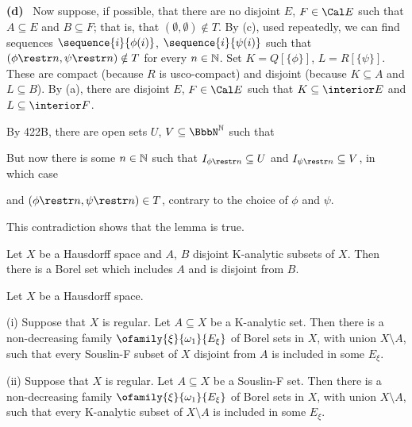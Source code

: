 {\medskip

{\bf (d)} \Quer\ Now suppose, if possible, that there are no disjoint
$E$, $F\in\Cal E$ such that $A\subseteq E$ and $B\subseteq F$;  that is,
that $(\emptyset,\emptyset)\notin T$.   By (c),
used repeatedly, we can find sequences
$\sequence{i}{\phi(i)}$, $\sequence{i}{\psi(i)}$ such that
$(\phi\restr n,\psi\restr n)\notin T$ for every $n\in\Bbb N$.   Set
$K=Q[\{\phi\}]$, $L=R[\{\psi\}]$.   These are compact (because $R$ is
usco-compact) and disjoint (because $K\subseteq A$ and $L\subseteq B$).
By (a), there are disjoint $E$, $F\in\Cal E$ such that
$K\subseteq\interior E$ and $L\subseteq\interior F$.

By 422B, there are open sets $U$, $V\subseteq\NN$ such that


\noindent But now there is some $n\in\Bbb N$ such that
$I_{\phi\restr n}\subseteq U$ and $I_{\psi\restr n}\subseteq V$, in
which case


\noindent and $(\phi\restr n,\psi\restr n)\in T$, contrary to the choice
of $\phi$ and $\psi$.\ \Bang

This contradiction shows that the lemma is true.
}%

 Let $X$ be a Hausdorff space and $A$, $B$
disjoint K-analytic subsets of $X$.   Then there is a Borel set which
includes $A$ and is disjoint from $B$.


 Let $X$ be a Hausdorff space.

(i) Suppose that $X$ is regular.   Let $A\subseteq X$ be a K-analytic
set.   Then there is a
non-decreasing family $\ofamily{\xi}{\omega_1}{E_{\xi}}$ of Borel sets
in $X$, with union $X\setminus A$, such that every Souslin-F subset of
$X$ disjoint from $A$ is included in some $E_{\xi}$.

(ii) Suppose that $X$ is regular.   Let $A\subseteq X$ be a Souslin-F
set.   Then there is a
non-decreasing family $\ofamily{\xi}{\omega_1}{E_{\xi}}$ of Borel sets
in $X$, with union $X\setminus A$, such that every K-analytic subset of
$X\setminus A$ is included in some $E_{\xi}$.

